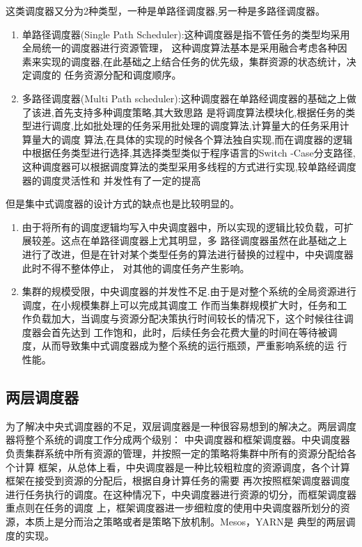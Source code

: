 这类调度器又分为2种类型，一种是单路径调度器,另一种是多路径调度器。
\begin{enumerate}
\item 单路径调度器(Single Path Scheduler):这种调度器是指不管任务的类型均采用全局统一的调度器进行资源管理，
这种调度算法基本是采用融合考虑各种因素来实现的调度器,在此基础之上结合任务的优先级，集群资源的状态统计，决定调度的
任务资源分配和调度顺序。
\item 多路径调度器(Multi Path scheduler):这种调度器在单路经调度器的基础之上做了该进,首先支持多种调度策略,其大致思路
是将调度算法模块化,根据任务的类型进行调度,比如批处理的任务采用批处理的调度算法,计算量大的任务采用计算量大的调度
算法,在具体的实现的时候各个算法独自实现,而在调度器的逻辑中根据任务类型进行选择,其选择类型类似于程序语言的Switch
-Case分支路径,这种调度器可以根据调度算法的类型采用多线程的方式进行实现,较单路经调度器的调度灵活性和
并发性有了一定的提高
\end{enumerate}

但是集中式调度器的设计方式的缺点也是比较明显的。
\begin{enumerate}
\item 由于将所有的调度逻辑均写入中央调度器中，所以实现的逻辑比较负载，可扩展较差。这点在单路径调度器上尤其明显，多
路径调度器虽然在此基础之上进行了改进，但是在针对某个类型任务的算法进行替换的过程中，中央调度器此时不得不整体停止，
对其他的调度任务产生影响。
\item 集群的规模受限，中央调度器的并发性不足.由于是对整个系统的全局资源进行调度，在小规模集群上可以完成其调度工
作而当集群规模扩大时，任务和工作负载加大，当调度与资源分配决策执行时间较长的情况下，这个时候往往调度器会首先达到
工作饱和，此时，后续任务会花费大量的时间在等待被调度，从而导致集中式调度器成为整个系统的运行瓶颈，严重影响系统的运
行性能。
\end{enumerate}

\subsection{两层调度器}
为了解决中央式调度器的不足，双层调度器是一种很容易想到的解决之。两层调度器将整个系统的调度工作分成两个级别：
中央调度器和框架调度器。中央调度器负责集群系统中所有资源的管理，并按照一定的策略将集群中所有的资源分配给各个计算
框架，从总体上看，中央调度器是一种比较粗粒度的资源调度，各个计算框架在接受到资源的分配后，根据自身计算任务的需要
再次按照框架调度器调度进行任务执行的调度。在这种情况下，中央调度器进行资源的切分，而框架调度器重点则在任务的调度
上，框架调度器进一步细粒度的使用中央调度器所划分的资源，本质上是分而治之策略或者是策略下放机制。Mesos，YARN是
典型的两层调度的实现。

